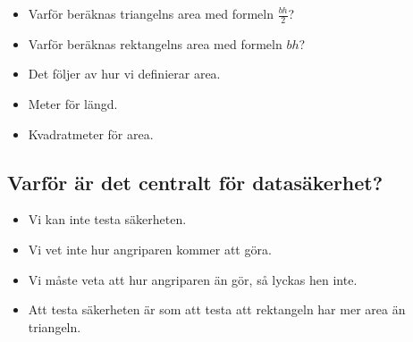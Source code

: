 \begin{frame}
  \begin{question}
    \begin{itemize}
      \item Varför beräknas triangelns area med formeln \(\frac{bh}{2}\)?
      \item Varför beräknas rektangelns area med formeln \(bh\)?
    \end{itemize}
  \end{question}
\end{frame}

\begin{frame}
  \begin{solution}
    \begin{itemize}
      \item Det följer av hur vi definierar area.
      \item Meter för längd.
      \item Kvadratmeter för area.
    \end{itemize}
  \end{solution}

%
\end{frame}

\subsection{Varför är det centralt för datasäkerhet?}

\begin{frame}
  \begin{remark}
    \begin{itemize}
      \item Vi kan inte testa säkerheten.
      \item Vi vet inte hur angriparen kommer att göra.
      \item Vi måste veta att hur angriparen än gör, så lyckas hen inte.
    \end{itemize}
  \end{remark}

  \pause

  \begin{example}
    \begin{itemize}
      \item Att testa säkerheten är som att testa att rektangeln har mer area 
        än triangeln.
    \end{itemize}
  \end{example}
\end{frame}

